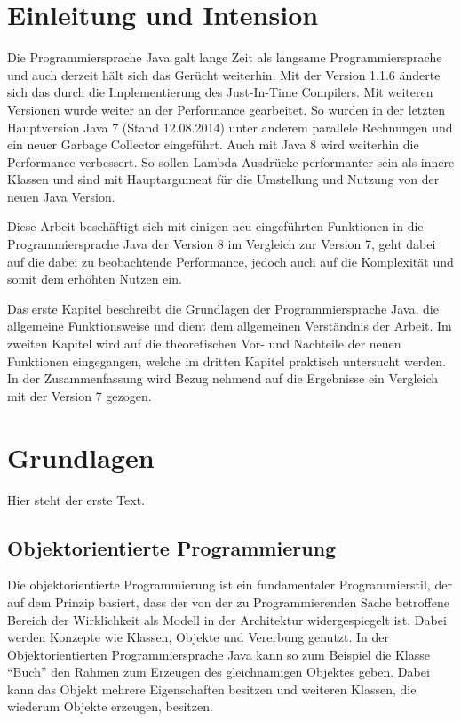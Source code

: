 
\chapter{Einleitung und Intension}
\label{sec:EinleitungUndIntension}
Die Programmiersprache Java galt lange Zeit als langsame Programmiersprache und
auch derzeit hält sich das Gerücht weiterhin.
Mit der Version 1.1.6 änderte sich das durch die Implementierung des
Just-In-Time Compilers\cite{symantec:symantec}.
Mit weiteren Versionen wurde weiter an der Performance gearbeitet. So wurden in
der letzten Hauptversion Java 7 (Stand 12.08.2014) unter anderem parallele
Rechnungen\cite{goetz:IBM} und ein neuer Garbage Collector
eingeführt\cite{humble:infoq}.
Auch mit Java 8 wird weiterhin die Performance verbessert\cite{gallardo:oracle}.
So sollen Lambda Ausdrücke performanter sein als innere Klassen und sind mit Hauptargument für
die Umstellung und Nutzung von der neuen Java Version.
 
Diese Arbeit beschäftigt sich mit einigen neu eingeführten Funktionen in die
Programmiersprache Java der Version 8 im Vergleich zur Version 7, geht dabei
auf die dabei zu beobachtende Performance, jedoch auch auf die Komplexität und
somit dem erhöhten Nutzen ein.
 
Das erste Kapitel beschreibt die Grundlagen der Programmiersprache
Java, die allgemeine Funktionsweise und dient dem allgemeinen Verständnis der
Arbeit.
Im zweiten Kapitel wird auf die theoretischen Vor- und Nachteile der neuen
Funktionen eingegangen, welche im dritten Kapitel praktisch untersucht werden.
In der Zusammenfassung wird Bezug nehmend auf die Ergebnisse ein Vergleich mit
der Version 7 gezogen.
 
\chapter{Grundlagen}
\label{sec:Grundlagen}
Hier steht der erste Text.

\section{Objektorientierte Programmierung}
\label{sec:OO}
Die objektorientierte Programmierung ist ein fundamentaler Programmierstil, der
auf dem Prinzip basiert, dass der von der zu Programmierenden Sache betroffene
Bereich der Wirklichkeit als Modell in der Architektur widergespiegelt ist.
Dabei werden Konzepte wie Klassen, Objekte und Vererbung genutzt.
In der Objektorientierten Programmiersprache Java kann so zum Beispiel die
Klasse "`Buch"' den Rahmen zum Erzeugen des gleichnamigen Objektes geben. Dabei
kann das Objekt mehrere Eigenschaften besitzen und weiteren Klassen, die
wiederum Objekte erzeugen, besitzen. 

